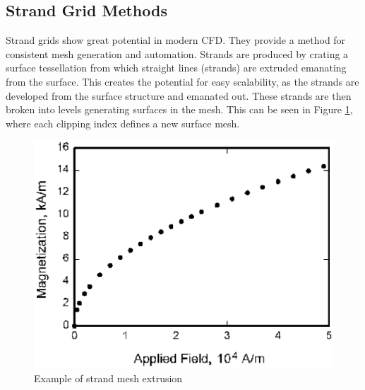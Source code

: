 \documentclass[draft]{aiaa-pretty}
\begin{document}
\subsection{Strand Grid Methods}
 Strand grids show great potential in modern CFD.  They provide a method for consistent mesh generation and automation.  Strands are produced by crating a surface tessellation from which
 straight lines (strands) are extruded emanating from the surface.  This creates the potential for easy scalability, as the strands are developed from the surface structure and emanated 
 out.  These strands are then broken into levels generating surfaces in the mesh.  This can be seen in Figure \ref{Strand},
 where each clipping index defines a new surface mesh. 
 \begin{figure}
  \centering
  \includegraphics[scale=.5]{figure_magnet.eps}
  \caption{Example of strand mesh extrusion \label{Strand}}
 \end{figure}
 
\end{document}
